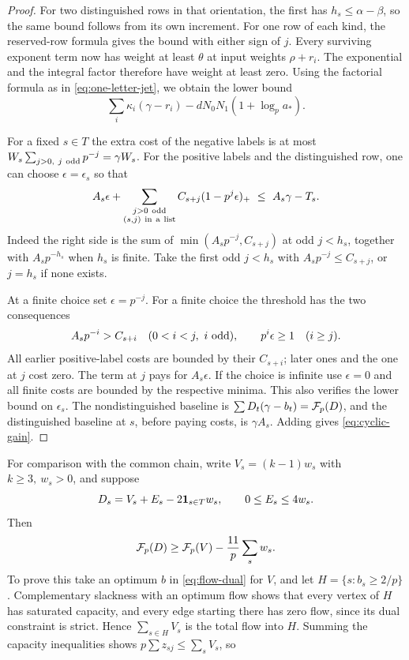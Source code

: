 \begin{proof}
For two distinguished rows
in that orientation, the first has \(h_s\le\alpha-\beta\), so
the same bound follows from its own increment. For one row of
each kind, the reserved-row formula gives the bound with either
sign of \(j\). Every surviving exponent term now has weight at
least \(\theta\) at input weights \(\rho+r_i\). The exponential
and the integral factor therefore have weight at least zero.
Using the factorial formula as in \eqref{eq:one-letter-jet}, we
obtain the lower bound
\[
       \sum_i\kappa_i(\gamma-r_i)-dN_0N_1(1+\log_p a_*).
\]

For a fixed \(s\in T\) the extra cost of the negative labels
is at most \(W_s\sum_{j>0,\ j\ {\rm odd}}p^{-j}=\gamma W_s\).
For the positive labels and the distinguished row, one can choose
\(\epsilon=\epsilon_s\) so that
\[
 A_s\epsilon+
 \sum_{\substack{j>0\ {\rm odd}\\(s,j)\ {\rm in\ a\ list}}}
       C_{s+j}(1-p^j\epsilon)_+
                \ \le\ A_s\gamma-T_s .
\]
Indeed the right side is the sum of
\(\min(A_sp^{-j},C_{s+j})\) at odd \(j<h_s\), together with
\(A_sp^{-h_s}\) when \(h_s\) is finite. Take the first odd
\(j<h_s\) with \(A_sp^{-j}\le C_{s+j}\), or \(j=h_s\) if none
exists.

At a finite choice set \(\epsilon=p^{-j}\).
For a finite choice the threshold has the two consequences
\[
  A_sp^{-i}>C_{s+i}\quad(0<i<j,\ i\ {\rm odd}),\qquad p^i\epsilon\ge1\quad(i\ge j).
\]
 All earlier
positive-label costs are bounded by their \(C_{s+i}\); later
ones and the one at \(j\) cost zero. The term at \(j\) pays for
\(A_s\epsilon\). If the choice is infinite use \(\epsilon=0\)
and all finite costs are bounded by the respective minima.
This also verifies the lower bound on \(\epsilon_s\). The
nondistinguished baseline is
\(\sum D_t(\gamma-b_t)={\cal F}_p(D)\), and the distinguished
baseline at \(s\), before paying costs, is \(\gamma A_s\).
Adding gives \eqref{eq:cyclic-gain}.
\end{proof}

For comparison with the common chain, write \(V_s=(k-1)w_s\)
with \(k\ge3,\ w_s>0\), and suppose
\[
      D_s=V_s+E_s-2{\bf1}_{s\in T}w_s,\qquad
                         0\le E_s\le4w_s .
\]
Then
\begin{equation}\label{eq:flow-comparison}
            {\cal F}_p(D)\ge {\cal F}_p(V)
                                   -\frac{11}{p}\sum_s w_s .
\end{equation}
To prove this take an optimum \(b\) in \eqref{eq:flow-dual}
for \(V\), and let \(H=\{s:b_s\ge2/p\}\). Complementary
slackness with an optimum flow shows that every vertex of \(H\)
has saturated capacity, and every edge starting there has zero
flow, since its dual constraint is strict. Hence
\(\sum_{s\in H}V_s\) is the total flow into \(H\). Summing the
capacity inequalities shows \(p\sum z_{sj}\le\sum_sV_s\), so

